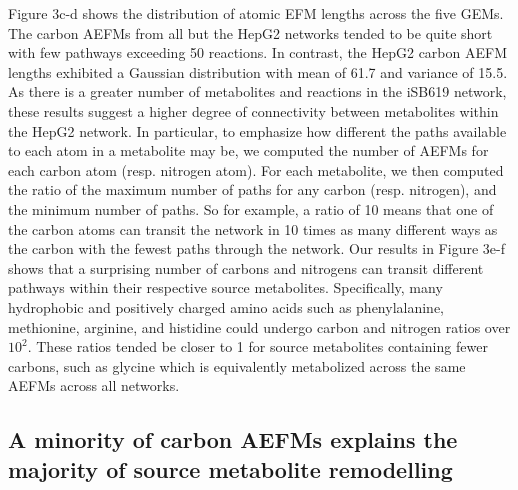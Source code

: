 \documentclass[12pt]{article}
\begin{document}
Figure 3c-d shows the distribution of atomic EFM lengths across the five
GEMs. The carbon AEFMs from all but the HepG2 networks tended to be quite
short with few pathways exceeding 50 reactions. In contrast, the HepG2
carbon AEFM lengths exhibited a Gaussian distribution with mean of 61.7
and variance of 15.5. As there is a greater number of metabolites and
reactions in the iSB619 network, these results suggest a higher degree of
connectivity between metabolites within the HepG2 network. In particular,
to emphasize how different the paths available to each atom in
a metabolite may be, we computed the number of AEFMs for each carbon atom
(resp. nitrogen atom). For each metabolite, we then computed the ratio of
the maximum number of paths for any carbon (resp. nitrogen), and the
minimum number of paths. So for example, a ratio of 10 means that one of
the carbon atoms can transit the network in 10 times as many different
ways as the carbon with the fewest paths through the network. Our results
in Figure 3e-f shows that a surprising number of carbons and nitrogens can
transit different pathways within their respective source metabolites.
Specifically, many hydrophobic and positively charged amino acids such as
phenylalanine, methionine, arginine, and histidine could undergo carbon
and nitrogen ratios over $10^2$. These ratios tended be closer to 1 for
source metabolites containing fewer carbons, such as glycine which is
equivalently metabolized across the same AEFMs across all networks.





\subsection*{A minority of carbon AEFMs explains the majority of source metabolite remodelling}

\end{document}
